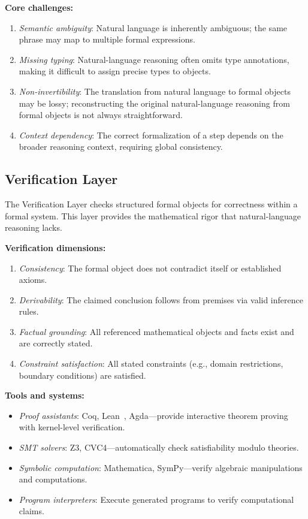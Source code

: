 \documentclass[11pt,a4paper]{article}
\begin{document}
\textbf{Core challenges:}
\begin{enumerate}[leftmargin=*]
    \item \textit{Semantic ambiguity}: Natural language is inherently ambiguous; the same phrase may map to multiple formal expressions.
    \item \textit{Missing typing}: Natural-language reasoning often omits type annotations, making it difficult to assign precise types to objects.
    \item \textit{Non-invertibility}: The translation from natural language to formal objects may be lossy; reconstructing the original natural-language reasoning from formal objects is not always straightforward.
    \item \textit{Context dependency}: The correct formalization of a step depends on the broader reasoning context, requiring global consistency.
\end{enumerate}

\subsection{Verification Layer}
\label{sec:verification}

The Verification Layer checks structured formal objects for correctness within a formal system. This layer provides the mathematical rigor that natural-language reasoning lacks.

\textbf{Verification dimensions:}
\begin{enumerate}[leftmargin=*]
    \item \textit{Consistency}: The formal object does not contradict itself or established axioms.
    \item \textit{Derivability}: The claimed conclusion follows from premises via valid inference rules.
    \item \textit{Factual grounding}: All referenced mathematical objects and facts exist and are correctly stated.
    \item \textit{Constraint satisfaction}: All stated constraints (e.g., domain restrictions, boundary conditions) are satisfied.
\end{enumerate}

\textbf{Tools and systems:}
\begin{itemize}[leftmargin=*]
    \item \textit{Proof assistants}: Coq, Lean~\cite{yang2023leandojo}, Agda---provide interactive theorem proving with kernel-level verification.
    \item \textit{SMT solvers}: Z3, CVC4---automatically check satisfiability modulo theories.
    \item \textit{Symbolic computation}: Mathematica, SymPy---verify algebraic manipulations and computations.
    \item \textit{Program interpreters}: Execute generated programs to verify computational claims.
\end{itemize}
\end{document}
